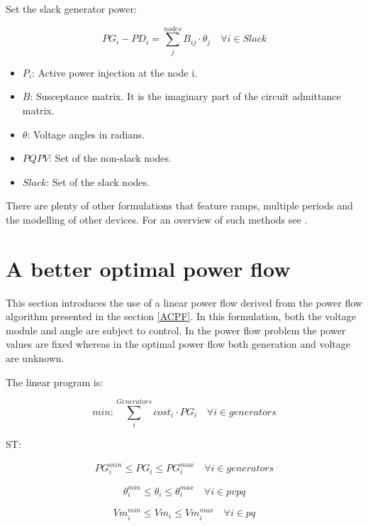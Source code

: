 \documentclass[nols,a4paper,twoside,symmetric,notoc,fleqn]{tufte-book}
\begin{document}
Set the slack generator power:

\begin{equation}
PG_i - PD_i=\sum_j^{nodes} B_{ij} \cdot \theta_j  \quad  \forall i \in Slack
\end{equation}

\begin{itemize}
	\item $P_i$: Active power injection at the node i.
	\item $B$: Susceptance matrix. It is the imaginary part of the circuit admittance matrix.
	\item $\theta$: Voltage angles in radians.
	\item $PQPV$: Set of the non-slack nodes.
	
	\item $Slack$: Set of the slack nodes.
\end{itemize}

There are plenty of other formulations that feature ramps, multiple periods and the modelling of other devices.
For an overview of such methods see \cite{taylor2015convex}.

\newpage
\section{A better optimal power flow}

This section introduces the use of a linear power flow derived from the power flow algorithm presented in the section \ref{ACPF}. In this formulation, both the voltage module and angle are subject to control. In the power flow problem the power values are fixed whereas in the optimal power flow both generation and voltage are unknown.

The linear program is:

\begin{equation}
min: \sum_i^{Generators} cost_i \cdot PG_i   \quad \forall i \in generators
\end{equation}

ST:

\begin{equation}
PG_i^{min} \leq PG_i \leq PG_i^{max}  \quad \forall i \in generators
\end{equation}

\begin{equation}
\theta_i^{min} \leq \theta_i \leq \theta_i^{max}  \quad \forall i \in pvpq
\end{equation}

\begin{equation}
Vm_i^{min} \leq Vm_i \leq Vm_i^{max}  \quad \forall i \in pq
\end{equation}
\end{document}
